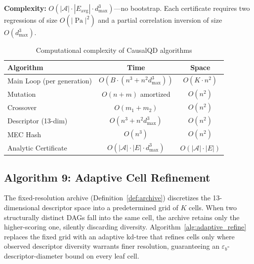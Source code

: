 \documentclass{article}
\theoremstyle{definition}
\theoremstyle{plain}
\theoremstyle{remark}
\DeclareMathOperator{\Pa}{Pa}
\begin{document}
\textbf{Complexity:} $O(|\mathcal{A}| \cdot |E_{\text{avg}}| \cdot d_{\max}^3)$---no
bootstrap. Each certificate requires two regressions of size $O(|\Pa|^2)$
and a partial correlation inversion of size $O(d_{\max}^3)$.

\begin{table}[htb]
\centering
\caption{Computational complexity of CausalQD algorithms}
\label{tab:complexity}
\begin{tabular}{lcc}
\toprule
\textbf{Algorithm} & \textbf{Time} & \textbf{Space} \\
\midrule
Main Loop (per generation) & $O(B \cdot (n^3 + n^2 d_{\max}^3))$ & $O(K \cdot n^2)$ \\
Mutation & $O(n + m)$ amortized & $O(n^2)$ \\
Crossover & $O(m_1 + m_2)$ & $O(n^2)$ \\
Descriptor (13-dim) & $O(n^3 + n^2 d_{\max}^3)$ & $O(n^2)$ \\
MEC Hash & $O(n^3)$ & $O(n^2)$ \\
Analytic Certificate & $O(|\mathcal{A}| \cdot |E| \cdot d_{\max}^3)$ & $O(|\mathcal{A}| \cdot |E|)$ \\
\bottomrule
\end{tabular}
\end{table}




\subsection{Algorithm 9: Adaptive Cell Refinement}
\label{sec:alg_adaptive_refine}

The fixed-resolution archive (Definition~\ref{def:archive}) discretizes
the 13-dimensional descriptor space into a predetermined grid of $K$ cells.
When two structurally distinct DAGs fall into the same cell, the archive
retains only the higher-scoring one, silently discarding diversity.
Algorithm~\ref{alg:adaptive_refine} replaces the fixed grid with an
adaptive kd-tree that refines cells only where observed descriptor
diversity warrants finer resolution, guaranteeing an
$\varepsilon_b$-descriptor-diameter bound on every leaf cell.
\end{document}
